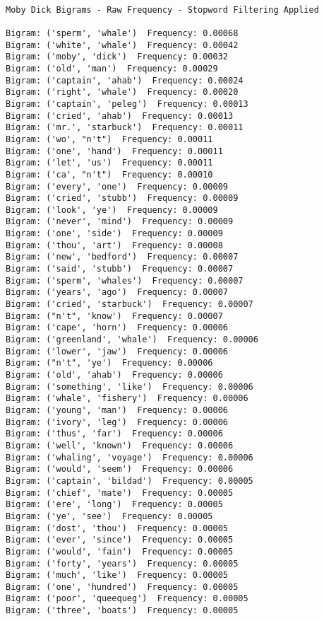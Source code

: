 \documentclass[11pt]{article}
\begin{document}
    \begin{Verbatim}[commandchars=\\\{\}]

Moby Dick Bigrams - Raw Frequency - Stopword Filtering Applied 

Bigram: ('sperm', 'whale')  Frequency: 0.00068
Bigram: ('white', 'whale')  Frequency: 0.00042
Bigram: ('moby', 'dick')  Frequency: 0.00032
Bigram: ('old', 'man')  Frequency: 0.00029
Bigram: ('captain', 'ahab')  Frequency: 0.00024
Bigram: ('right', 'whale')  Frequency: 0.00020
Bigram: ('captain', 'peleg')  Frequency: 0.00013
Bigram: ('cried', 'ahab')  Frequency: 0.00013
Bigram: ('mr.', 'starbuck')  Frequency: 0.00011
Bigram: ('wo', "n't")  Frequency: 0.00011
Bigram: ('one', 'hand')  Frequency: 0.00011
Bigram: ('let', 'us')  Frequency: 0.00011
Bigram: ('ca', "n't")  Frequency: 0.00010
Bigram: ('every', 'one')  Frequency: 0.00009
Bigram: ('cried', 'stubb')  Frequency: 0.00009
Bigram: ('look', 'ye')  Frequency: 0.00009
Bigram: ('never', 'mind')  Frequency: 0.00009
Bigram: ('one', 'side')  Frequency: 0.00009
Bigram: ('thou', 'art')  Frequency: 0.00008
Bigram: ('new', 'bedford')  Frequency: 0.00007
Bigram: ('said', 'stubb')  Frequency: 0.00007
Bigram: ('sperm', 'whales')  Frequency: 0.00007
Bigram: ('years', 'ago')  Frequency: 0.00007
Bigram: ('cried', 'starbuck')  Frequency: 0.00007
Bigram: ("n't", 'know')  Frequency: 0.00007
Bigram: ('cape', 'horn')  Frequency: 0.00006
Bigram: ('greenland', 'whale')  Frequency: 0.00006
Bigram: ('lower', 'jaw')  Frequency: 0.00006
Bigram: ("n't", 'ye')  Frequency: 0.00006
Bigram: ('old', 'ahab')  Frequency: 0.00006
Bigram: ('something', 'like')  Frequency: 0.00006
Bigram: ('whale', 'fishery')  Frequency: 0.00006
Bigram: ('young', 'man')  Frequency: 0.00006
Bigram: ('ivory', 'leg')  Frequency: 0.00006
Bigram: ('thus', 'far')  Frequency: 0.00006
Bigram: ('well', 'known')  Frequency: 0.00006
Bigram: ('whaling', 'voyage')  Frequency: 0.00006
Bigram: ('would', 'seem')  Frequency: 0.00006
Bigram: ('captain', 'bildad')  Frequency: 0.00005
Bigram: ('chief', 'mate')  Frequency: 0.00005
Bigram: ('ere', 'long')  Frequency: 0.00005
Bigram: ('ye', 'see')  Frequency: 0.00005
Bigram: ('dost', 'thou')  Frequency: 0.00005
Bigram: ('ever', 'since')  Frequency: 0.00005
Bigram: ('would', 'fain')  Frequency: 0.00005
Bigram: ('forty', 'years')  Frequency: 0.00005
Bigram: ('much', 'like')  Frequency: 0.00005
Bigram: ('one', 'hundred')  Frequency: 0.00005
Bigram: ('poor', 'queequeg')  Frequency: 0.00005
Bigram: ('three', 'boats')  Frequency: 0.00005

    \end{Verbatim}
\end{document}
